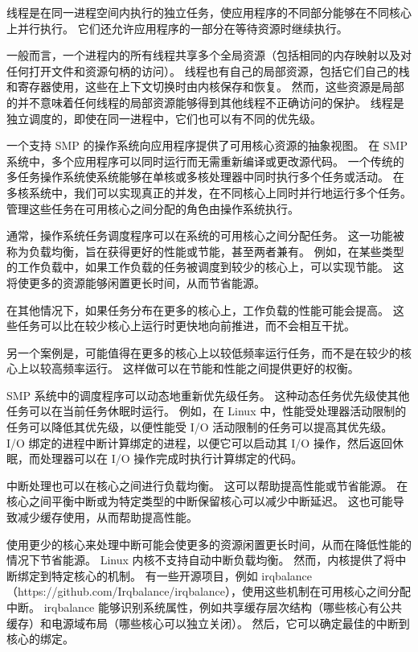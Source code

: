 线程是在同一进程空间内执行的独立任务，使应用程序的不同部分能够在不同核心上并行执行。
它们还允许应用程序的一部分在等待资源时继续执行。

一般而言，一个进程内的所有线程共享多个全局资源（包括相同的内存映射以及对任何打开文件和资源句柄的访问）。
线程也有自己的局部资源，包括它们自己的栈和寄存器使用，这些在上下文切换时由内核保存和恢复。
然而，这些资源是局部的并不意味着任何线程的局部资源能够得到其他线程不正确访问的保护。
线程是独立调度的，即使在同一进程中，它们也可以有不同的优先级。

一个支持 SMP 的操作系统向应用程序提供了可用核心资源的抽象视图。
在 SMP 系统中，多个应用程序可以同时运行而无需重新编译或更改源代码。
一个传统的多任务操作系统使系统能够在单核或多核处理器中同时执行多个任务或活动。
在多核系统中，我们可以实现真正的并发，在不同核心上同时并行地运行多个任务。
管理这些任务在可用核心之间分配的角色由操作系统执行。

通常，操作系统任务调度程序可以在系统的可用核心之间分配任务。
这一功能被称为负载均衡，旨在获得更好的性能或节能，甚至两者兼有。
例如，在某些类型的工作负载中，如果工作负载的任务被调度到较少的核心上，可以实现节能。
这将使更多的资源能够闲置更长时间，从而节省能源。

在其他情况下，如果任务分布在更多的核心上，工作负载的性能可能会提高。
这些任务可以比在较少核心上运行时更快地向前推进，而不会相互干扰。

另一个案例是，可能值得在更多的核心上以较低频率运行任务，而不是在较少的核心上以较高频率运行。
这样做可以在节能和性能之间提供更好的权衡。

SMP 系统中的调度程序可以动态地重新优先级任务。
这种动态任务优先级使其他任务可以在当前任务休眠时运行。
例如，在 Linux 中，性能受处理器活动限制的任务可以降低其优先级，以便性能受 I/O 活动限制的任务可以提高其优先级。
I/O 绑定的进程中断计算绑定的进程，以便它可以启动其 I/O 操作，然后返回休眠，而处理器可以在 I/O 操作完成时执行计算绑定的代码。

中断处理也可以在核心之间进行负载均衡。
这可以帮助提高性能或节省能源。
在核心之间平衡中断或为特定类型的中断保留核心可以减少中断延迟。
这也可能导致减少缓存使用，从而帮助提高性能。

使用更少的核心来处理中断可能会使更多的资源闲置更长时间，从而在降低性能的情况下节省能源。
Linux 内核不支持自动中断负载均衡。
然而，内核提供了将中断绑定到特定核心的机制。
有一些开源项目，例如 irqbalance（https://github.com/Irqbalance/irqbalance），使用这些机制在可用核心之间分配中断。
irqbalance 能够识别系统属性，例如共享缓存层次结构（哪些核心有公共缓存）和电源域布局（哪些核心可以独立关闭）。
然后，它可以确定最佳的中断到核心的绑定。

